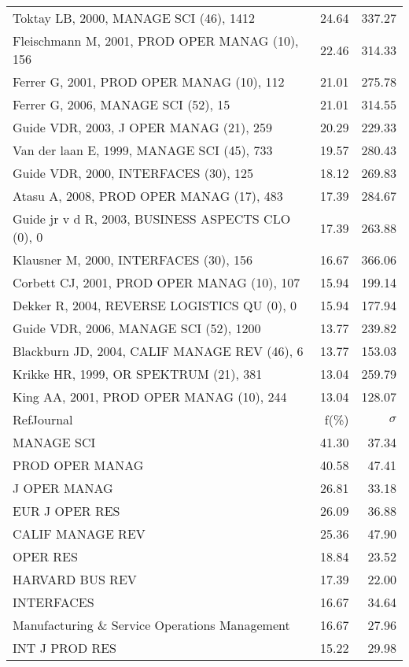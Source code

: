 \documentclass[a4paper,11pt]{report}
\begin{document}
\begin{landscape}
\begin{table}[!ht]
{\begin{tabular}{|l r r|}
Toktay LB, 2000, MANAGE SCI (46), 1412 & 24.64 & 337.27\\
Fleischmann M, 2001, PROD OPER MANAG (10), 156 & 22.46 & 314.33\\
Ferrer G, 2001, PROD OPER MANAG (10), 112 & 21.01 & 275.78\\
Ferrer G, 2006, MANAGE SCI (52), 15 & 21.01 & 314.55\\
Guide VDR, 2003, J OPER MANAG (21), 259 & 20.29 & 229.33\\
Van der laan E, 1999, MANAGE SCI (45), 733 & 19.57 & 280.43\\
Guide VDR, 2000, INTERFACES (30), 125 & 18.12 & 269.83\\
Atasu A, 2008, PROD OPER MANAG (17), 483 & 17.39 & 284.67\\
Guide jr v d R, 2003, BUSINESS ASPECTS CLO (0), 0 & 17.39 & 263.88\\
Klausner M, 2000, INTERFACES (30), 156 & 16.67 & 366.06\\
Corbett CJ, 2001, PROD OPER MANAG (10), 107 & 15.94 & 199.14\\
Dekker R, 2004, REVERSE LOGISTICS QU (0), 0 & 15.94 & 177.94\\
Guide VDR, 2006, MANAGE SCI (52), 1200 & 13.77 & 239.82\\
Blackburn JD, 2004, CALIF MANAGE REV (46), 6 & 13.77 & 153.03\\
Krikke HR, 1999, OR SPEKTRUM (21), 381 & 13.04 & 259.79\\
King AA, 2001, PROD OPER MANAG (10), 244 & 13.04 & 128.07\\
\hline
\hline
RefJournal & f(\%) & $\sigma$\\
\hline
MANAGE SCI & 41.30 & 37.34\\
PROD OPER MANAG & 40.58 & 47.41\\
J OPER MANAG & 26.81 & 33.18\\
EUR J OPER RES & 26.09 & 36.88\\
CALIF MANAGE REV & 25.36 & 47.90\\
OPER RES & 18.84 & 23.52\\
HARVARD BUS REV & 17.39 & 22.00\\
INTERFACES & 16.67 & 34.64\\
Manufacturing \& Service Operations Management & 16.67 & 27.96\\
INT J PROD RES & 15.22 & 29.98\\
\hline
\end{tabular}
}
\end{table}


\end{landscape}
\end{document}
